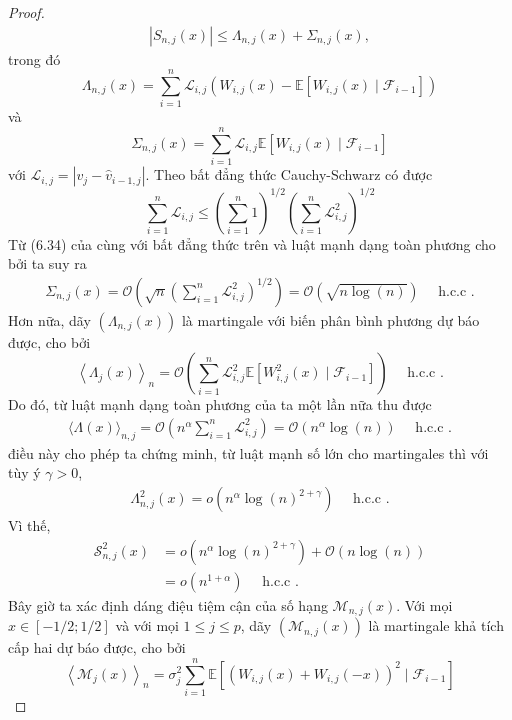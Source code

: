 \begin{proof}
\begin{align}
    \left|S_{n, j}(x)\right| \leq \Lambda_{n, j}(x)+\Sigma_{n, j}(x),
    \label{9.13}
\end{align}
trong đó
$$
\Lambda_{n, j}(x)=\sum_{i=1}^{n} \mathcal{L}_{i, j}\left(W_{i, j}(x)-\mathbb{E}\left[W_{i, j}(x) \mid \mathcal{F}_{i-1}\right]\right)
$$
và
$$
\Sigma_{n, j}(x)=\sum_{i=1}^{n} \mathcal{L}_{i, j} \mathbb{E}\left[W_{i, j}(x) \mid \mathcal{F}_{i-1}\right]
$$
với $\mathcal{L}_{i, j}=\left|v_{j}-\widehat{v}_{i-1, j}\right|$. 
Theo bất đẳng thức Cauchy-Schwarz có được
$$\sum_{i=1}^{n} \mathcal{L}_{i, j}\leq \left(\sum_{i=1}^{n} 1\right)^{1/2}\left(\sum_{i=1}^{n} \mathcal{L}_{i, j}^2\right)^{1/2}
$$
Từ (6.34) của \cite{bercu} cùng với bất đẳng thức trên và luật mạnh dạng toàn phương cho bởi  ta suy ra
\begin{align}
    \Sigma_{n, j}(x)=\mathcal{O}\left(\sqrt{n}\left(\sum_{i=1}^{n} \mathcal{L}_{i, j}^{2}\right)^{1 / 2}\right)=\mathcal{O}(\sqrt{n \log (n)}) \quad \text { h.c.c .}
    \label{9.14}
\end{align}
Hơn nữa, dãy $\left(\Lambda_{n, j}(x)\right)$ là martingale với biến phân bình phương dự báo được, cho bởi
$$
\left\langle\Lambda_{j}(x)\right\rangle_{n}=\mathcal{O}\left(\sum_{i=1}^{n} \mathcal{L}_{i, j}^{2} \mathbb{E}\left[W_{i, j}^{2}(x) \mid \mathcal{F}_{i-1}\right]\right) \quad \text { h.c.c .}
$$
Do đó, từ luật mạnh dạng toàn phương của  ta một lần nữa thu được
\begin{align}
    \langle\Lambda(x)\rangle_{n, j}=\mathcal{O}\left(n^{\alpha} \sum_{i=1}^{n} \mathcal{L}_{i, j}^{2}\right)=\mathcal{O}\left(n^{\alpha} \log (n)\right) \quad \text { h.c.c .}
    \label{9.15}
\end{align}
điều này cho phép ta chứng minh, từ luật mạnh số lớn cho martingales thì với tùy ý $\gamma>0$,
\begin{align}
    \Lambda_{n, j}^{2}(x)=o\left(n^{\alpha} \log (n)^{2+\gamma}\right) \quad \text { h.c.c .}
    \label{9.16}
\end{align}
Vì thế,
\begin{align}
\mathcal{S}_{n, j}^{2}(x) & =o\left(n^{\alpha} \log (n)^{2+\gamma}\right)+\mathcal{O}(n \log (n)) \\
& =o\left(n^{1+\alpha}\right) \quad \text { h.c.c . }
\label{9.17}
\end{align}
Bây giờ ta xác định dáng điệu tiệm cận của số hạng $\mathcal{M}_{n, j}(x)$. Với mọi $x \in[-1 / 2 ; 1 / 2]$ và với mọi $1 \leq j \leq p$, dãy $\left(\mathcal{M}_{n, j}(x)\right)$ là martingale khả tích cấp hai dự báo được, cho bởi
$$
\left\langle\mathcal{M}_{j}(x)\right\rangle_{n}=\sigma_{j}^{2} \sum_{i=1}^{n} \mathbb{E}\left[\left(W_{i, j}(x)+W_{i, j}(-x)\right)^{2} \mid \mathcal{F}_{i-1}\right]
$$
\end{proof}
